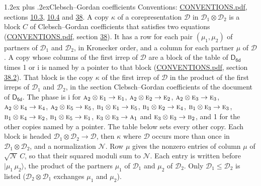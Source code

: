 \documentclass[10pt,a4paper]{article}
\makeatletter
\renewcommand\section{\@startsection{section}{1}{\z@}{-3ex plus -1ex minus -.2ex}%
  {1.2ex plus .2ex}{\normalfont\large\sffamily\bfseries\color{parttitle}}}
\numberwithin{equation}{section}
\newcommand{\grp}[1]{\mathsf{#1}}
\newcommand{\irr}[1]{\text{\normalfont\scshape #1}}
\newcommand{\iunit}{\mathrm{i}}
\newcommand{\irrprod}{\otimes}
\newcommand{\mult}{\kappa}
\newcommand{\intx}{\mu}
\newcommand{\cgnorm}{\mathcal{N}}
\newcommand{\prodket}[2]{\lvert {#1}\,{#2}\rangle}
\makeatother
\begin{document}
\section{Clebsch--Gordan coefficients}\label{s:clebsch_gordan}
Conventions: \href{../../CONVENTIONS.pdf}{CONVENTIONS.pdf}, sections \href{../../../rotation/CONVENTIONS.pdf\#conv.10.3}{10.3}, \href{../../../rotation/CONVENTIONS.pdf\#conv.10.4}{10.4} and \href{../../CONVENTIONS.pdf\#conv.38}{38}.
\leavevmode\label{n:index.copy}\label{n:matrix.cg.stored}A copy $\mult$ of a corepresentation $\mathcal{D}$ in $\mathcal{D}_1\irrprod\mathcal{D}_2$ is a block $C$ of Clebsch--Gordan coefficients that satisfies two equations (\href{../../CONVENTIONS.pdf}{CONVENTIONS.pdf}, section \href{../../CONVENTIONS.pdf\#conv.38}{38}). \label{n:index.cg}It has a row for each pair $(\intx_1, \intx_2)$ of partners of $\mathcal{D}_1$ and $\mathcal{D}_2$, in Kronecker order, and a column for each partner $\intx$ of $\mathcal{D}$.
A copy whose columns of the first irrep of $\mathcal{D}$ are a block of the table of $\grp{D_{6d}}$ times 1 or $\iunit$ is named by a pointer to that block (\href{../../CONVENTIONS.pdf}{CONVENTIONS.pdf}, section \href{../../CONVENTIONS.pdf\#conv.38.2}{38.2}). That block is the copy $\mult$ of the first irrep of $\mathcal{D}$ in the product of the first irreps of $\mathcal{D}_1$ and $\mathcal{D}_2$, in the section Clebsch--Gordan coefficients of the document of \href{../../../rotation/data/pdf/D6d.pdf}{$\grp{D_{6d}}$}. The phase is $\iunit$ for $\irr{a}_{2}\irrprod \irr{e}_{1}\to \irr{e}_{1}$, $\irr{a}_{2}\irrprod \irr{e}_{2}\to \irr{e}_{2}$, $\irr{a}_{2}\irrprod \irr{e}_{3}\to \irr{e}_{3}$, $\irr{a}_{2}\irrprod \irr{e}_{4}\to \irr{e}_{4}$, $\irr{a}_{2}\irrprod \irr{e}_{5}\to \irr{e}_{5}$, $\irr{b}_{1}\irrprod \irr{e}_{1}\to \irr{e}_{5}$, $\irr{b}_{1}\irrprod \irr{e}_{2}\to \irr{e}_{4}$, $\irr{b}_{1}\irrprod \irr{e}_{3}\to \irr{e}_{3}$, $\irr{b}_{1}\irrprod \irr{e}_{4}\to \irr{e}_{2}$, $\irr{b}_{1}\irrprod \irr{e}_{5}\to \irr{e}_{1}$, $\irr{e}_{3}\irrprod \irr{e}_{3}\to \irr{a}_{1}$ and $\irr{e}_{3}\irrprod \irr{e}_{3}\to \irr{b}_{2}$, and 1 for the other copies named by a pointer. The table below sets every other copy.
Each block is headed $\mathcal{D}_1\irrprod\mathcal{D}_2\to\mathcal{D}$, then $\mult$ where $\mathcal{D}$ occurs more than once in $\mathcal{D}_1\irrprod\mathcal{D}_2$, and a normalization $\cgnorm$. Row $\intx$ gives the nonzero entries of column $\intx$ of $\sqrt{\cgnorm}\,C$, so that their squared moduli sum to $\cgnorm$. \label{n:vector.ket.product}Each entry is written before $\prodket{\intx_1}{\intx_2}$, the product of the partners $\intx_1$ of $\mathcal{D}_1$ and $\intx_2$ of $\mathcal{D}_2$. Only $\mathcal{D}_1 \le \mathcal{D}_2$ is listed ($\mathcal{D}_2\irrprod\mathcal{D}_1$ exchanges $\intx_1$ and $\intx_2$).
\end{document}
